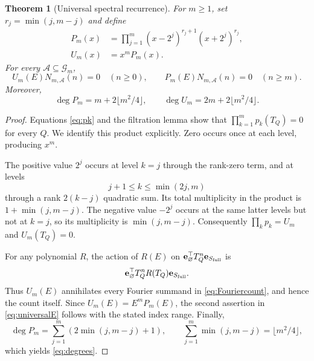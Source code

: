 \documentclass[11pt,letterpaper]{article}
\newtheorem{theorem}{Theorem}[section]
\theoremstyle{definition}
\newcommand{\1}{\mathbf 1}
\newcommand{\e}{\mathbf e}
\begin{document}
\begin{theorem}[Universal spectral recurrence]\label{thm:universal}
For $m\ge1$, set $r_j=\min(j,m-j)$ and define
\begin{align}
 P_m(x)&=\prod_{j=1}^m(x-2^j)^{r_j+1}(x+2^j)^{r_j},
 \label{eq:Pm}\\
 U_m(x)&=x^mP_m(x).
 \label{eq:Um}
\end{align}
For every $\mathcal A\subseteq\mathcal G_m$,
\begin{equation}\label{eq:universalE}
 U_m(E)N_{m,\mathcal A}(n)=0\quad(n\ge0),
 \qquad
 P_m(E)N_{m,\mathcal A}(n)=0\quad(n\ge m).
\end{equation}
Moreover,
\begin{equation}\label{eq:degrees}
 \deg P_m=m+2\lfloor m^2/4\rfloor,
 \qquad \deg U_m=2m+2\lfloor m^2/4\rfloor.
\end{equation}
\end{theorem}
\begin{proof}
Equations \eqref{eq:pk} and the filtration lemma show that
$\prod_{k=1}^mp_k(T_Q)=0$ for every $Q$. We identify this product explicitly.
Zero occurs once at each level, producing $x^m$.

The positive value $2^j$ occurs at level $k=j$ through the rank-zero term,
and at levels
\[
 j+1\le k\le\min(2j,m)
\]
through a rank $2(k-j)$ quadratic sum. Its total multiplicity in the product
is $1+\min(j,m-j)$. The negative value $-2^j$ occurs at the same latter levels
but not at $k=j$, so its multiplicity is $\min(j,m-j)$.
Consequently $\prod_kp_k=U_m$ and $U_m(T_Q)=0$.

For any polynomial $R$, the action of $R(E)$ on
$\e_{\varnothing}^{\top}T_Q^n\e_{S_{\rm full}}$ is
\[
 \e_{\varnothing}^{\top}T_Q^nR(T_Q)\e_{S_{\rm full}}.
\]
Thus $U_m(E)$ annihilates every Fourier summand in \eqref{eq:Fouriercount},
and hence the count itself. Since $U_m(E)=E^mP_m(E)$, the second assertion in
\eqref{eq:universalE} follows with the stated index range.
Finally,
\[
 \deg P_m=\sum_{j=1}^m(2\min(j,m-j)+1),
 \qquad \sum_{j=1}^m\min(j,m-j)=\lfloor m^2/4\rfloor,
\]
which yields \eqref{eq:degrees}.
\end{proof}
\end{document}
